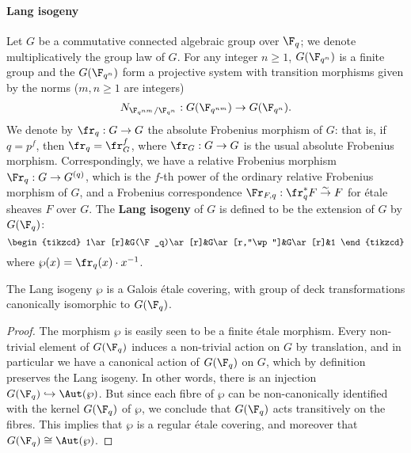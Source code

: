 \paragraph{Lang isogeny}
Let $G$ be a commutative connected algebraic group over $\F_q$; we denote multiplicatively the group law of $G$. For any integer $n\geq 1$, $G(\F_{q^n})$ is a finite group and the $G(\F_{q^n})$ form a projective system with transition morphisms given by the norms ($m,n\geq 1$ are integers)
\[N_{\F_{q^{nm}}/\F_{q^n}}:G(\F_{q^{nm}})\to G(\F_{q^n}).\]
We denote by $\fr_q:G\to G$ the absolute Frobenius morphism of $G$: that is, if $q=p^f$, then $\fr_q=\fr_G^f$, where $\fr_G:G\to G$ is the usual absolute Frobenius morphism. Correspondingly, we have a relative Frobenius morphism $\Fr_q:G\to G^{(q)}$, which is the $f$-th power of the ordinary relative Frobenius morphism of $G$, and a Frobenius correspondence $\Fr_{F,q}:\fr_q^*F\stackrel{\sim}{\to}F$ for \'etale sheaves $F$ over $G$. The \textbf{Lang isogeny} of $G$ is defined to be the extension of $G$ by $G(\F_q)$:
\[\begin{tikzcd}
1\ar[r]&G(\F_q)\ar[r]&G\ar[r,"\wp"]&G\ar[r]&1
\end{tikzcd}\]
where $\wp(x)=\fr_q(x)\cdot x^{-1}$. 

\begin{lemma}
The Lang isogeny $\wp$ is a Galois \'etale covering, with group of deck transformations canonically isomorphic to $G(\F_q)$.
\end{lemma}
\begin{proof}
The morphism $\wp$ is easily seen to be a finite \'etale morphism. Every non-trivial element of $G(\F_q)$ induces a non-trivial action on $G$ by translation, and in particular we have a canonical action of $G(\F_q)$ on $G$, which by definition preserves the Lang isogeny. In other words, there is an injection $G(\F_q)\hookrightarrow\Aut(\wp)$. But since each fibre of $\wp$ can be non-canonically identified with the kernel $G(\F_q)$ of $\wp$, we conclude that $G(\F_q)$ acts transitively on the fibres. This implies that $\wp$ is a regular \'etale covering, and moreover that $G(\F_q)\cong\Aut(\wp)$.
\end{proof}

